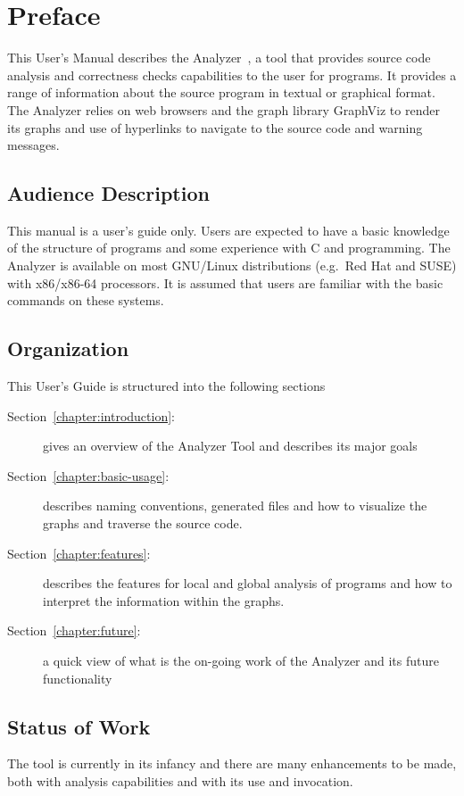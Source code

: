 \section*{Preface}

This User's Manual describes the \openshmem
Analyzer~\cite{hernandez2012openshmem}, a tool that provides source
code analysis and correctness checks capabilities to the user for
\openshmem programs. It provides a range of information about the
source program in textual or graphical format. The \openshmem Analyzer
relies on web browsers and the graph library GraphViz to render its
graphs and use of hyperlinks to navigate to the source code and
warning messages.

\subsection*{Audience Description}

This manual is a user's guide only. Users are expected to have a basic
knowledge of the structure of programs and some experience with C and
\openshmem programming. The \openshmem Analyzer is available on most
GNU/Linux distributions (e.g.\ Red Hat and SUSE) with x86/x86-64
processors. It is assumed that users are familiar with the basic
commands on these systems.

\subsection*{Organization}

This User's Guide is structured into the following sections

\begin{description}
\item[Section~\ref{chapter:introduction}:~]
  gives an overview of the \openshmem Analyzer Tool and describes its
  major goals
\item[Section~\ref{chapter:basic-usage}:~]
  describes naming conventions, generated files and how to visualize
  the graphs and traverse the source code.
\item[Section~\ref{chapter:features}:~]
  describes the features for local and global analysis of \openshmem
  programs and how to interpret the information within the graphs.
\item [Section~\ref{chapter:future}:~] a quick
  view of what is the on-going work of the \openshmem Analyzer and its
  future functionality
\end{description}

\subsection*{Status of Work}

The tool is currently in its infancy and there are many enhancements
to be made, both with analysis capabilities and with its use and
invocation.

